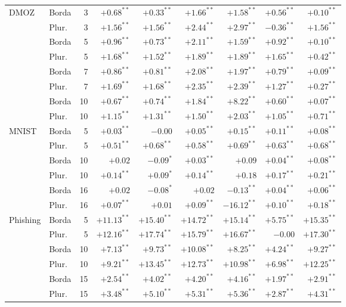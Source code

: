 \begin{table}[tbp]
\begin{tabular}{llrrrrrrr}
    \midrule
    DMOZ & Borda & 3 & $+0.68^{**}$ & $+0.33^{**}$ & $+1.66^{**}$ & $+1.58^{**}$ & $+0.56^{**}$ & $+0.10^{**}$ \\
     & Plur. & 3 & $+1.56^{**}$ & $+1.56^{**}$ & $+2.44^{**}$ & $+2.97^{**}$ & $-0.36^{**}$ & $+1.56^{**}$ \\
     & Borda & 5 & $+0.96^{**}$ & $+0.73^{**}$ & $+2.11^{**}$ & $+1.59^{**}$ & $+0.92^{**}$ & $+0.10^{**}$ \\
     & Plur. & 5 & $+1.68^{**}$ & $+1.52^{**}$ & $+1.89^{**}$ & $+1.89^{**}$ & $+1.65^{**}$ & $+0.42^{**}$ \\
     & Borda & 7 & $+0.86^{**}$ & $+0.81^{**}$ & $+2.08^{**}$ & $+1.97^{**}$ & $+0.79^{**}$ & $+0.09^{**}$ \\
     & Plur. & 7 & $+1.69^{**}$ & $+1.68^{**}$ & $+2.35^{**}$ & $+2.39^{**}$ & $+1.27^{**}$ & $+0.27^{**}$ \\
     & Borda & 10 & $+0.67^{**}$ & $+0.74^{**}$ & $+1.84^{**}$ & $+8.22^{**}$ & $+0.60^{**}$ & $+0.07^{**}$ \\
     & Plur. & 10 & $+1.15^{**}$ & $+1.31^{**}$ & $+1.50^{**}$ & $+2.03^{**}$ & $+1.05^{**}$ & $+0.71^{**}$ \\
    \midrule
    MNIST & Borda & 5 & $+0.03^{**}$ & $-0.00$ & $+0.05^{**}$ & $+0.15^{**}$ & $+0.11^{**}$ & $+0.08^{**}$ \\
     & Plur. & 5 & $+0.51^{**}$ & $+0.68^{**}$ & $+0.58^{**}$ & $+0.69^{**}$ & $+0.63^{**}$ & $+0.68^{**}$ \\
     & Borda & 10 & $+0.02$ & $-0.09^{*}$ & $+0.03^{**}$ & $+0.09$ & $+0.04^{**}$ & $+0.08^{**}$ \\
     & Plur. & 10 & $+0.14^{**}$ & $+0.09^{*}$ & $+0.14^{**}$ & $+0.18$ & $+0.17^{**}$ & $+0.21^{**}$ \\
     & Borda & 16 & $+0.02$ & $-0.08^{*}$ & $+0.02$ & $-0.13^{**}$ & $+0.04^{**}$ & $+0.06^{**}$ \\
     & Plur. & 16 & $+0.07^{**}$ & $+0.01$ & $+0.09^{**}$ & $-16.12^{**}$ & $+0.10^{**}$ & $+0.18^{**}$ \\
    \midrule
    Phishing & Borda & 5 & $+11.13^{**}$ & $+15.40^{**}$ & $+14.72^{**}$ & $+15.14^{**}$ & $+5.75^{**}$ & $+15.35^{**}$ \\
     & Plur. & 5 & $+12.16^{**}$ & $+17.74^{**}$ & $+15.79^{**}$ & $+16.67^{**}$ & $-0.00$ & $+17.30^{**}$ \\
     & Borda & 10 & $+7.13^{**}$ & $+9.73^{**}$ & $+10.08^{**}$ & $+8.25^{**}$ & $+4.24^{**}$ & $+9.27^{**}$ \\
     & Plur. & 10 & $+9.21^{**}$ & $+13.45^{**}$ & $+12.73^{**}$ & $+10.98^{**}$ & $+6.98^{**}$ & $+12.25^{**}$ \\
     & Borda & 15 & $+2.54^{**}$ & $+4.02^{**}$ & $+4.20^{**}$ & $+4.16^{**}$ & $+1.97^{**}$ & $+2.91^{**}$ \\
     & Plur. & 15 & $+3.48^{**}$ & $+5.10^{**}$ & $+5.31^{**}$ & $+5.36^{**}$ & $+2.87^{**}$ & $+4.31^{**}$ \\
    \bottomrule
  \end{tabular}
\end{table}
